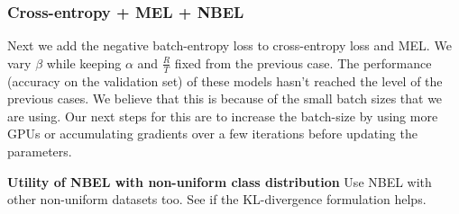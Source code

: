 %

\subsubsection{Cross-entropy + MEL + NBEL}
Next we add the negative batch-entropy loss to cross-entropy loss and MEL. We vary $\beta$ while
keeping $\alpha$ and $\frac{R}{T}$ fixed from the previous case. The performance (accuracy on the
validation set) of these models hasn't reached the level of the previous cases. We
believe that this is because of the small batch sizes that we are using. Our next steps for this are
to increase the batch-size by using more GPUs or accumulating gradients over a few iterations before
updating the parameters.

\textbf{Utility of NBEL with non-uniform class distribution}
\newline
Use NBEL with other non-uniform datasets too. See if the KL-divergence formulation helps. 

